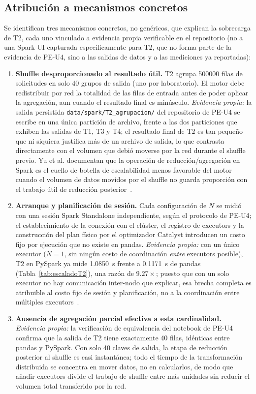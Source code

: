 \documentclass[10pt,journal]{IEEEtran}
\begin{document}
\subsection{Atribuci\'on a mecanismos concretos}
Se identifican tres mecanismos concretos, no gen\'ericos, que explican la
sobrecarga de T2, cada uno vinculado a evidencia propia verificable en el
repositorio (no a una Spark UI capturada espec\'ificamente para T2, que no
forma parte de la evidencia de PE-U4, sino a las salidas de datos y a las
mediciones ya reportadas):
\begin{enumerate}
\item \textbf{Shuffle desproporcionado al resultado \'util.} T2 agrupa
\num{500000} filas de solicitudes en solo 40 grupos de salida (uno por
laboratorio). El motor debe redistribuir por red la totalidad de las filas de
entrada antes de poder aplicar la agregaci\'on, aun cuando el resultado final
es min\'usculo. \emph{Evidencia propia:} la salida persistida
\texttt{data/spark/T2\_agrupacion/} del repositorio de PE-U4 se escribe en una
\'unica partici\'on de archivo, frente a las dos particiones que exhiben las
salidas de T1, T3 y T4; el resultado final de T2 es tan peque\~no que ni
siquiera justifica m\'as de un archivo de salida, lo que contrasta
directamente con el volumen que debi\'o moverse por la red durante el
shuffle previo. Yu et al. documentan que la operaci\'on de
reducci\'on/agregaci\'on en Spark es el cuello de botella de escalabilidad
menos favorable del motor cuando el volumen de datos movidos por el shuffle
no guarda proporci\'on con el trabajo \'util de reducci\'on
posterior~\cite{sparker2021}.
\item \textbf{Arranque y planificaci\'on de sesi\'on.} Cada configuraci\'on de
$N$ se midi\'o con una sesi\'on Spark Standalone independiente, seg\'un el
protocolo de PE-U4; el establecimiento de la conexi\'on con el cl\'uster, el
registro de executors y la construcci\'on del plan f\'isico por el
optimizador Catalyst introducen un costo fijo por ejecuci\'on que no existe en
pandas. \emph{Evidencia propia:} con un \'unico executor ($N=1$, sin ning\'un
costo de coordinaci\'on \emph{entre} executors posible), T2 en PySpark ya
mide \SI{1.0850}{\second} frente a \SI{0.1171}{\second} de pandas
(Tabla~\ref{tab:escaladoT2}), una raz\'on de $9.27\times$; puesto que con un
solo executor no hay comunicaci\'on inter-nodo que explicar, esa brecha
completa es atribuible al costo fijo de sesi\'on y planificaci\'on, no a la
coordinaci\'on entre m\'ultiples executors~\cite{zaharia2016}.
\item \textbf{Ausencia de agregaci\'on parcial efectiva a esta cardinalidad.}
\emph{Evidencia propia:} la verificaci\'on de equivalencia del notebook de
PE-U4 confirma que la salida de T2 tiene exactamente 40 filas, id\'enticas
entre pandas y PySpark. Con solo 40 claves de salida, la etapa de
reducci\'on posterior al shuffle es casi instant\'anea; todo el tiempo de la
transformaci\'on distribuida se concentra en mover datos, no en calcularlos,
de modo que a\~nadir executors divide el trabajo de shuffle entre m\'as
unidades sin reducir el volumen
total transferido por la red.
\end{enumerate}
\end{document}
